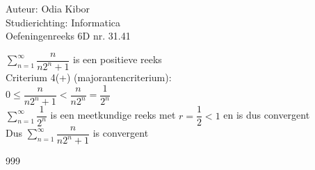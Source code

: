\documentclass[a4paper]{article}
\begin{document}
  
\noindent \large Auteur: Odia Kibor \\
\noindent \large Studierichting: Informatica\\
\noindent \large Oefeningenreeks 6D nr. 31.41
\\

\medskip

\normalsize


$\displaystyle\sum\limits_{n = 1}^\infty\dfrac{n}{n2^n + 1}$ is een positieve reeks \\

Criterium 4(+) (majorantencriterium): \\

$\displaystyle 0 \leq \dfrac{n}{n2^n + 1} < \dfrac{n}{n2^n} = \dfrac{1}{2^n}$ \\

$\displaystyle\sum\limits_{n = 1}^\infty\dfrac{1}{2^n}$ is een meetkundige reeks met $r = \dfrac{1}{2} < 1$ en is dus convergent \\

Dus $\displaystyle\sum\limits_{n = 1}^\infty\dfrac{n}{n2^n + 1}$ is convergent \\




















\begin{thebibliography}{999}
\end{thebibliography}
\end{document}
